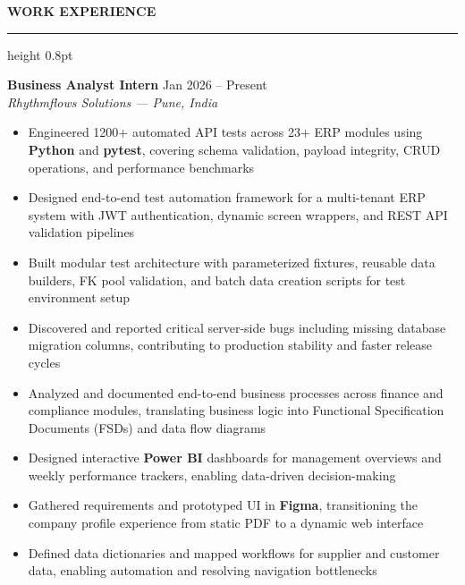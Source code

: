 \documentclass[11pt,letterpaper]{article}
\renewcommand{\section}[1]{
  \vspace{6pt}
  {\bfseries\large #1}
  \vspace{2pt}
  \hrule height 0.8pt
  \vspace{4pt}
}
\begin{document}
\section{WORK EXPERIENCE}

\textbf{Business Analyst Intern} \hfill Jan 2026 -- Present\\
\textit{Rhythmflows Solutions --- Pune, India}

\begin{itemize}
  \item Engineered 1200+ automated API tests across 23+ ERP modules using \textbf{Python} and \textbf{pytest}, covering schema validation, payload integrity, CRUD operations, and performance benchmarks
  \item Designed end-to-end test automation framework for a multi-tenant ERP system with JWT authentication, dynamic screen wrappers, and REST API validation pipelines
  \item Built modular test architecture with parameterized fixtures, reusable data builders, FK pool validation, and batch data creation scripts for test environment setup
  \item Discovered and reported critical server-side bugs including missing database migration columns, contributing to production stability and faster release cycles
  \item Analyzed and documented end-to-end business processes across finance and compliance modules, translating business logic into Functional Specification Documents (FSDs) and data flow diagrams
  \item Designed interactive \textbf{Power BI} dashboards for management overviews and weekly performance trackers, enabling data-driven decision-making
  \item Gathered requirements and prototyped UI in \textbf{Figma}, transitioning the company profile experience from static PDF to a dynamic web interface
  \item Defined data dictionaries and mapped workflows for supplier and customer data, enabling automation and resolving navigation bottlenecks
\end{itemize}

\vspace{2pt}

\end{document}

